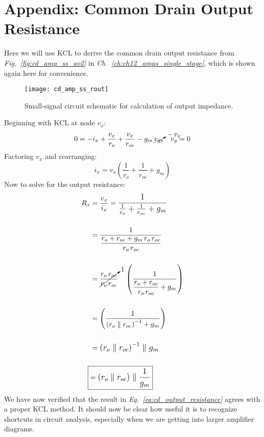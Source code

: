 \chapter{Appendix: Common Drain Output Resistance}
\label{app:cd_output_kcl}
Here we will use KCL to derive the common drain output resistance from \emph{Fig.~\ref{fig:cd_amp_ss_av2}} in \emph{Ch.~\ref{ch:ch12_amps_single_stage}}, which is shown again here for convenience.
\begin{figure}[H]
\centering
\texttt{[image: cd\_amp\_ss\_rout]}
\caption{Small-signal circuit schematic for calculation of output impedance.}
\end{figure}
\noindent
Beginning with KCL at node $v_x$:
    \begin{align*}
        0 &= -i_x + \frac{v_x}{r_o} + \frac{v_x}{r_{oc}} - g_m\,\cancelto{-\,v_x}{v_{gs}} &\textit{$v_g = 0$}
    \end{align*}
Factoring $v_x$ and rearranging:
    \begin{equation*}
        i_x = v_x \left(\frac{1}{r_o} + \frac{1}{r_{oc}} + g_m \right)
    \end{equation*}
Now to solve for the output resistance:
    \begin{align}
        R_x &= \frac{v_x}{i_x} = \mathlarger{\frac{1}{\frac{1}{r_o} + \frac{1}{r_{oc}} + g_m}}\\[0.5cm]
        &= \frac{1}{\mathlarger{\frac{r_o + r_{oc} + g_m\,r_o\,r_{oc}}{r_o\,r_{oc}}}}\\[0.5cm]
        &= \cancelto{1}{\frac{r_o\,r_{oc}}{r_o\,r_{oc}}} \quad
                \left( \frac{1}{\mathlarger{\frac{r_o + r_{oc}}{r_o\,r_{oc}} + g_m}} \right)\\[0.5cm]
        &= \left( \frac{1}{\mathlarger{{\left(r_o \parallel r_{oc}\right)}^{-1} + g_m}} \right)\\[0.5cm]
        &= \mathlarger{{\left(r_o \parallel r_{oc}\right)}^{-1} \parallel g_m}\\[0.5cm]
        \Aboxed{&= \mathlarger{\left(r_o \parallel r_{oc}\right) \parallel \frac{1}{g_m}}}
    \end{align}
We have now verified that the result in \emph{Eq.~\ref{eq:cd_output_resistance}} agrees with a proper KCL method.  It should now be clear how useful it is to recognize shortcuts in circuit analysis, especially when we are getting into larger amplifier diagrams.
